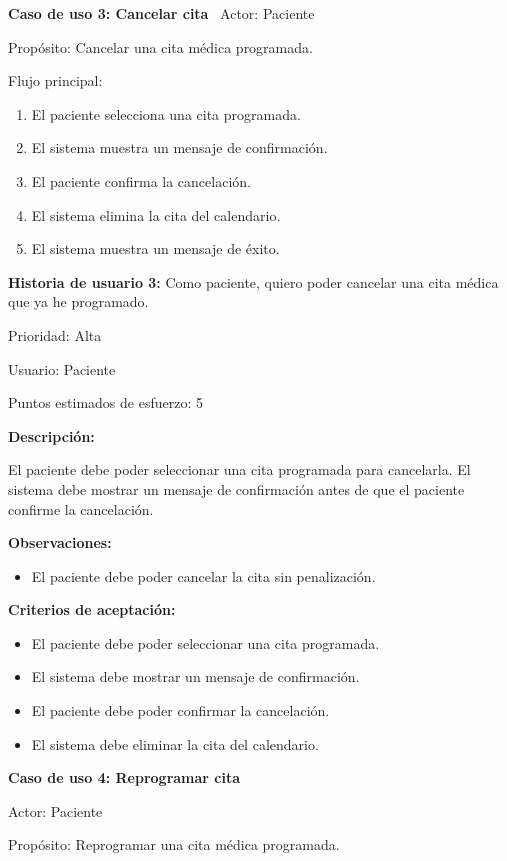 \documentclass{article}
\theoremstyle{mytheoremstyle}
\theoremstyle{mytheoremstyle}
\theoremstyle{myproblemstyle}
\begin{document}
\textbf{Caso de uso 3: Cancelar cita} \newline \
Actor: Paciente

Propósito: Cancelar una cita médica programada.

Flujo principal:
\begin{enumerate} 
    \item El paciente selecciona una cita programada.
    \item El sistema muestra un mensaje de confirmación.
    \item El paciente confirma la cancelación.
    \item El sistema elimina la cita del calendario.
    \item El sistema muestra un mensaje de éxito.
    \end{enumerate}  



\textbf{Historia de usuario 3:}  
Como paciente, quiero poder cancelar una cita médica que ya he programado.

Prioridad: Alta

Usuario: Paciente

Puntos estimados de esfuerzo: 5

\textbf{Descripción:} 

El paciente debe poder seleccionar una cita programada para cancelarla. El sistema debe mostrar un mensaje de confirmación antes de que el paciente confirme la cancelación.

\textbf{Observaciones:} 
\begin{itemize}
    \item El paciente debe poder cancelar la cita sin penalización.
\end{itemize}  

\textbf{Criterios de aceptación:} 
\begin{itemize}
    \item El paciente debe poder seleccionar una cita programada.
    \item El sistema debe mostrar un mensaje de confirmación.
    \item El paciente debe poder confirmar la cancelación.
    \item El sistema debe eliminar la cita del calendario.
\end{itemize}  

\textbf{Caso de uso 4: Reprogramar cita} 

Actor: Paciente

Propósito: Reprogramar una cita médica programada.
\end{document}
